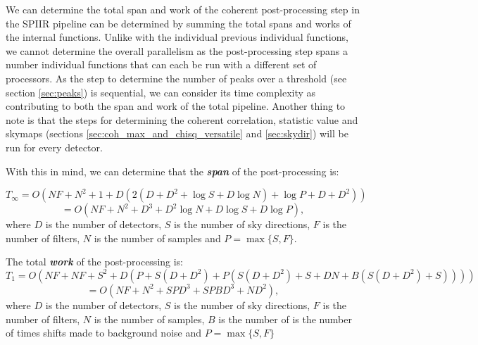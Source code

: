 \documentclass{article}
\begin{document}
We can determine the total span and work of the coherent post-processing step in the SPIIR pipeline can be determined by summing the total spans and works of the internal functions.
Unlike with the individual previous individual functions, we cannot determine the overall parallelism as the post-processing step spans a number individual functions that can each be run with a different set of processors.
As the step to determine the number of peaks over a threshold (see section \ref{sec:peaks}) is sequential, we can consider its time complexity as contributing to both the span and work of the total pipeline.
Another thing to note is that the steps for determining the coherent correlation, statistic value and skymaps (sections \ref{sec:coh_max_and_chisq_versatile} and \ref{sec:skydir}) will be run for every detector.

With this in mind, we can determine that the \textit{\textbf{span}} of the post-processing is:

\[
    T_\infty = O(NF + N^2 + 1 + D(2(D + D^2 + \log S + D \log N) + \log P + D + D^2))
\]
\[
    = O(NF + N^2 + D^3 + D^2 \log N + D \log S + D \log P),
\]
where \(D\) is the number of detectors, \(S\) is the number of sky directions, \(F\) is the number of filters, \(N\) is the number of samples and \(P = \max\{ S, F \}\).

The total \textit{\textbf{work}} of the post-processing is:
\[
    T_1 = O(NF + NF + S^2 + D(P + S(D + D^2) + P(S(D + D^2) + S + DN + B(S(D + D^2) + S))))
\]
\[
    = O(NF + N^2 + SPD^3 + SPBD^3 + ND^2),
\]
where \(D\) is the number of detectors, \(S\) is the number of sky directions, \(F\) is the number of filters, \(N\) is the number of samples, \(B\) is the number of is the number of times shifts made to background noise and \(P = \max\{ S, F \}\)

\printbibliography[
    heading=bibintoc,
    title={Bibliography}
]{}
\end{document}
